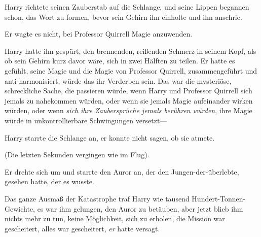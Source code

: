 Harry richtete seinen Zauberstab auf die Schlange, und seine Lippen begannen schon, das Wort  zu formen, bevor sein Gehirn ihn einholte und ihn anschrie.

Er wagte es nicht, bei Professor Quirrell Magie anzuwenden.

Harry hatte ihn gespürt, den brennenden, reißenden Schmerz in seinem Kopf, als ob sein Gehirn kurz davor wäre, sich in zwei Hälften zu teilen. Er hatte es gefühlt, seine Magie und die Magie von Professor Quirrell, zusammengeführt und anti-harmonisiert, würde das ihr Verderben sein. Das war die mysteriöse, schreckliche Sache, die passieren würde, wenn Harry und Professor Quirrell sich jemals zu nahekommen würden, oder wenn sie jemals Magie aufeinander wirken würden, oder wenn \emph{sich ihre Zaubersprüche jemals berühren würden}, ihre Magie würde in unkontrollierbare Schwingungen versetzt—

Harry starrte die Schlange an, er konnte nicht sagen, ob sie atmete.

(Die letzten Sekunden vergingen wie im Flug).

Er drehte sich um und starrte den Auror an, der den Jungen-der-überlebte, gesehen hatte, der es wusste.

Das ganze Ausmaß der Katastrophe traf Harry wie tausend Hundert-Tonnen-Gewichte, es war ihm gelungen, den Auror zu betäuben, aber jetzt blieb ihm nichts mehr zu tun, keine Möglichkeit, sich zu erholen, die Mission war gescheitert, alles war gescheitert, \emph{er} hatte versagt.

